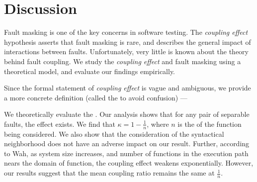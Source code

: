 \documentclass[preprint,nonatbib]{sigplanconf}\usepackage[]{graphicx}\usepackage[]{color}
\begin{document}
\begin{table}
\centering
{}
\caption{Summary for all Commons-math. The rownames indicate the number of
  patches involved.
  The SeparateFaults column shows the number
of faults when the patches were separately analyzed, and JoinedFaults column
shows the number of faults when the patches were combined and analyzed.
RemovedFaults indicate the number of faults from SeparateFaults that were
removed in JoinedFaults, and AddedFaults indicate the number of newly added
faults that were not in SeparateFaults.}
\label{tbl:summarymath}
\end{table}



\section{Discussion}
\label{sec:discussion}

Fault masking is one of the key concerns in software testing. The
\emph{coupling effect} hypothesis asserts that fault masking is rare,
and describes the general impact of interactions between
faults. Unfortunately, very little is known about the theory behind
fault coupling. We study the \emph{coupling effect} and fault masking
using a theoretical model, and evaluate our findings empirically.

Since the formal statement of \emph{coupling effect}
is vague and ambiguous, we provide a more concrete
definition (called the \efaultT to avoid confusion) ---
\textit{\cHypothesis}

We theoretically evaluate the \efaultT.
Our analysis shows that for any pair of separable faults, the \couplingC
effect exists. We find that \kappaT $\kappa = 1 - \frac{1}{n}$, where $n$
is the \foutput of the function being considered. We also show that the
consideration of the syntactical neighborhood does not have an adverse impact on
our result. Further, according to Wah, as system size increases, and
number of functions in the execution path nears the domain of function,
the coupling effect weakens exponentially. However, our results suggest
that the mean coupling ratio remains the same at $\frac{1}{n}$.
\end{document}
